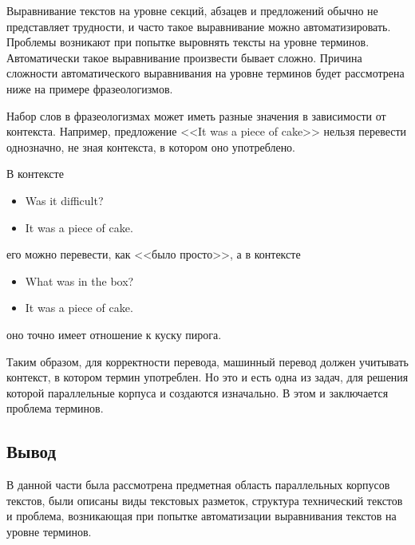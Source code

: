 Выравнивание текстов на уровне секций, абзацев и предложений обычно не представляет трудности, и часто такое выравнивание можно автоматизировать.
Проблемы возникают при попытке выровнять тексты на уровне терминов.
Автоматически такое выравнивание произвести бывает сложно.
Причина сложности автоматического выравнивания на уровне терминов будет рассмотрена ниже на примере фразеологизмов.

Набор слов в фразеологизмах может иметь разные значения в зависимости от контекста.
Например, предложение <<It was a piece of cake>> нельзя перевести однозначно, не зная контекста, в котором оно употреблено.

В контексте 
\begin{itemize}
    \item Was it difficult?
    \item It was a piece of cake.
\end{itemize}
его можно перевести, как <<было просто>>, а в контексте
\begin{itemize}
    \item What was in the box?
    \item It was a piece of cake.
\end{itemize}
оно точно имеет отношение к куску пирога.

Таким образом, для корректности перевода, машинный перевод должен учитывать контекст, в котором термин употреблен.
Но это и есть одна из задач, для решения которой параллельные корпуса и создаются изначально.
В этом и заключается проблема терминов.



\subsection{Вывод}

В данной части была рассмотрена предметная область параллельных корпусов текстов, были описаны виды текстовых разметок, структура технический текстов и проблема, возникающая при попытке автоматизации выравнивания текстов на уровне терминов.
